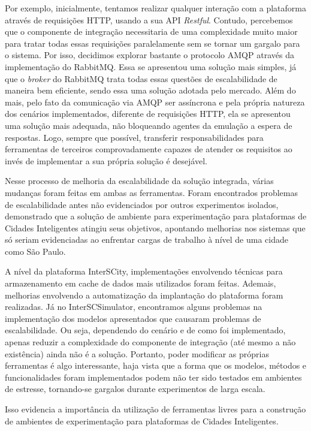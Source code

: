 Por exemplo, inicialmente, tentamos realizar qualquer interação com a plataforma através de requisições HTTP, usando a sua API \textit{Restful}.
Contudo, percebemos que o componente de integração necessitaria de uma complexidade muito maior para tratar todas essas requisições paralelamente sem se tornar um
gargalo para o sistema.
Por isso, decidimos explorar bastante o protocolo AMQP através da implementação do RabbitMQ.
Essa se apresentou uma solução mais simples, já que o \textit{broker} do RabbitMQ trata todas essas questões de escalabilidade de maneira bem eficiente, sendo essa
uma solução adotada pelo mercado.
Além do mais, pelo fato da comunicação via AMQP ser assíncrona e pela própria natureza dos cenários implementados, diferente de requisições HTTP, ela se apresentou uma
solução mais adequada, não bloqueando agentes da emulação a espera de respostas.
Logo, sempre que possível, transferir responsabilidades para ferramentas de terceiros comprovadamente capazes de atender os requisitos ao invés de implementar a sua
própria solução é desejável.

Nesse processo de melhoria da escalabilidade da solução integrada, várias mudanças foram feitas em ambas as ferramentas.
Foram encontrados problemas de escalabilidade antes não evidenciados por outros experimentos isolados, demonstrado que a solução de ambiente para experimentação para
plataformas de Cidades Inteligentes atingiu seus objetivos, apontando melhorias nos sistemas que só seriam evidenciadas ao enfrentar cargas de trabalho à nível de uma
cidade como São Paulo.

A nível da plataforma InterSCity, implementações envolvendo técnicas para armazenamento em cache de dados mais utilizados foram feitas.
Ademais, melhorias envolvendo a automatização da implantação do plataforma foram realizadas.
Já no InterSCSimulator, encontramos alguns problemas na implementação dos modelos apresentados que causaram problemas de escalabilidade.
Ou seja, dependendo do cenário e de como foi implementado, apenas reduzir a complexidade do componente de integração (até mesmo a não existência) ainda não é a solução.
Portanto, poder modificar as próprias ferramentas é algo interessante, haja vista que a forma que os modelos, métodos e funcionalidades foram implementados podem não
ter sido testados em ambientes de estresse, tornando-se gargalos durante experimentos de larga escala.

Isso evidencia a importância da utilização de ferramentas livres para a construção de ambientes de experimentação para plataformas de Cidades Inteligentes.
